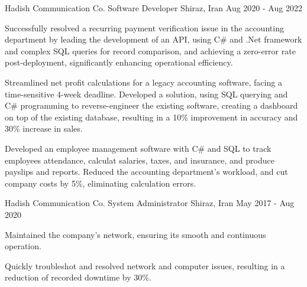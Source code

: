 

\begin{cventries}

    \cventry
    {Hadish Communication Co.} %
    {Software Developer} %
    {Shiraz, Iran} %
    {Aug 2020 - Aug 2022} %
    {
      \begin{cvitems} %
        \item{Successfully resolved a recurring payment verification issue in the accounting department by leading the development of an API, using C\# and .Net framework and complex SQL queries for record comparison, and achieving a zero-error rate post-deployment, significantly enhancing operational efficiency.}
        \item{Streamlined net profit calculations for a legacy accounting software, facing a time-sensitive 4-week deadline. Developed a solution, using SQL querying and C\# programming to reverse-engineer the existing software, creating a dashboard on top of the existing database, resulting in a 10\% improvement in accuracy and 30\% increase in sales.}
        \item{Developed an employee management software with C\# and SQL to track employees attendance, calculat salaries, taxes, and insurance, and produce payslips and reports. Reduced the accounting department's workload, and cut company costs by 5\%, eliminating calculation errors.}
      \end{cvitems}
    }%
    \cventry
    {Hadish Communication Co.} %
    {System Administrator} %
    {Shiraz, Iran} %
    {May 2017 - Aug 2020} %
    {
      \begin{cvitems} %
        \item {Maintained the company's network, ensuring its smooth and continuous operation.}
        \item {Quickly troubleshot and resolved network and computer issues, resulting in a reduction of recorded downtime by 30\%.}

\end{cvitems}}
\end{cventries}
